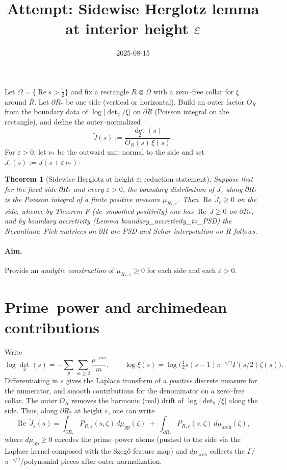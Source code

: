 \documentclass[11pt]{article}
\title{Attempt: Sidewise Herglotz lemma at interior height $\varepsilon$}
\date{2025-08-15}
\newtheorem{theorem}{Theorem}
\theoremstyle{remark}
\newcommand{\ReS}{\operatorname{Re}}
\begin{document}
\maketitle

Let $\Omega=\{\ReS s>\tfrac12\}$ and fix a rectangle $R\Subset\Omega$ with a zero--free collar for $\xi$ around $\overline R$. Let $\partial R_*$ be one side (vertical or horizontal). Build an outer factor $O_R$ from the boundary data of $\log|\det_2/\xi|$ on $\partial R$ (Poisson integral on the rectangle), and define the outer--normalized
\[\widetilde J(s):=\frac{\det_2(s)}{O_R(s)\,\xi(s)}.\]
For $\varepsilon>0$, let $\nu_*$ be the outward unit normal to the side and set $\widetilde J_\varepsilon(s):=\widetilde J(s+\varepsilon\,\nu_*)$.

\begin{theorem}[Sidewise Herglotz at height $\varepsilon$; reduction statement]\label{thm:side-herglotz}
Suppose that for the fixed side $\partial R_*$ and every $\varepsilon>0$, the boundary distribution of $\widetilde J_\varepsilon$ along $\partial R_*$ is the Poisson integral of a finite \emph{positive} measure $\mu_{R_*,\varepsilon}$. Then $\ReS\,\widetilde J_\varepsilon\ge0$ on the side, whence by Theorem F (de--smoothed positivity) one has $\ReS\,\widetilde J\ge0$ on $\partial R_*$, and by boundary accretivity (Lemma boundary\_accretivity\_to\_PSD) the Nevanlinna--Pick matrices on $\partial R$ are PSD and Schur interpolation on $R$ follows.
\end{theorem}

\paragraph{Aim.} Provide an \emph{analytic construction} of $\mu_{R_*,\varepsilon}\ge0$ for each side and each $\varepsilon>0$.

\section*{Prime--power and archimedean contributions}
Write
\[\log\det_2(s)= -\sum_{p}\sum_{m\ge2} \frac{p^{-ms}}{m},\qquad \log\xi(s)=\log\big(\tfrac12 s(s-1)\pi^{-s/2}\Gamma(s/2)\zeta(s)\big).\]
Differentiating in $s$ gives the Laplace transform of a \emph{positive} discrete measure for the numerator, and smooth contributions for the denominator on a zero--free collar. The outer $O_R$ removes the harmonic (real) drift of $\log|\det_2/\xi|$ along the side. Thus, along $\partial R_*$ at height $\varepsilon$, one can write
\[\ReS\,\widetilde J_\varepsilon(s)=\int_{\partial R_*}\! P_{R,\varepsilon}(s,\zeta)\, d\mu_{\mathrm{pp}}(\zeta)\; +\; \int_{\partial R_*}\! P_{R,\varepsilon}(s,\zeta)\, d\mu_{\mathrm{arch}}(\zeta),\]
where $d\mu_{\mathrm{pp}}\ge0$ encodes the prime--power atoms (pushed to the side via the Laplace kernel composed with the Szeg\H{o} feature map) and $d\mu_{\mathrm{arch}}$ collects the $\Gamma$/$\pi^{-s/2}$/polynomial pieces after outer normalization.
\end{document}
